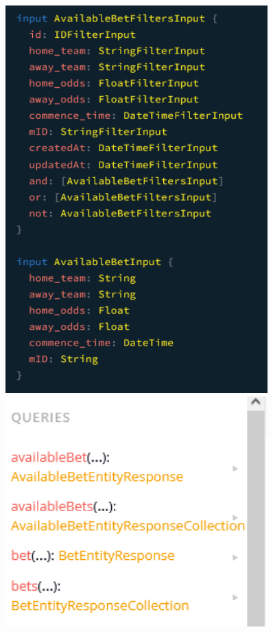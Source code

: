 \documentclass[singlecolumn]{article}
\begin{document}
\begin{figure}[H]
\begin{minipage}[c]{0.25\textwidth}
    \includegraphics[width=0.9\textwidth]{graphqlschema2.png}
    \end{minipage}%
    \centering
    \begin{minipage}[c]{0.25\textwidth}
    \centering
    \includegraphics[width=0.9\textwidth]{graphql1.png}

\end{minipage}
\end{figure}
\end{document}
